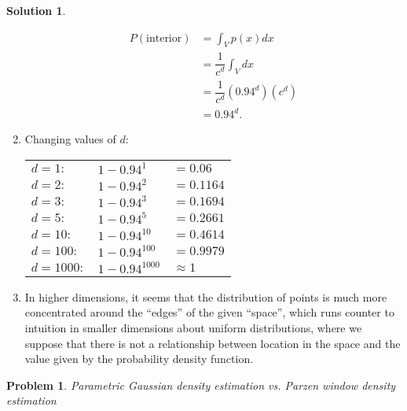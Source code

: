 \documentclass{article}
\newtheorem{problem}{Problem}
\theoremstyle{definition}
\newtheorem*{solution}{Solution}
\begin{document}
\begin{solution}
\begin{enumerate}[1.]
        \begin{equation*}
        	\begin{split}
            	P(\text{interior}) & = \int_{V} p(x) dx \\
                & = \dfrac{1}{c^{d}} \int_{V} dx \\
                & = \dfrac{1}{c^{d}} (0.94^{d})(c^{d}) \\& = 0.94^{d}.
            \end{split}
        \end{equation*}
        
        \item Changing values of $d$: \\
        	\begin{center}
        	\begin{tabular}{l l l}
            	$d = 1:$ & $1 - 0.94^{1}$ & $= 0.06$ \\
                $d = 2:$ & $1 - 0.94^{2}$ & $= 0.1164$ \\
                $d = 3:$ & $1 - 0.94^{3}$ & $= 0.1694$ \\
                $d = 5:$ & $1 - 0.94^{5}$ & $= 0.2661$ \\
                $d = 10:$ & $1 - 0.94^{10}$ & $= 0.4614$ \\
                $d = 100:$ & $1 - 0.94^{100}$ & $= 0.9979$ \\
                $d = 1000:$ & $1 - 0.94^{1000}$ & $\approx 1$ \\
        	\end{tabular}
           	\end{center}
        
        \item In higher dimensions, it seems that the distribution of points is much more concentrated around the ``edges'' of the given ``space'', which runs counter to intuition in smaller dimensions about uniform distributions, where we suppose that there is not a relationship between location in the space and the value given by the probability density function.
        
    \end{enumerate}
\end{solution}

\begin{problem}
Parametric Gaussian density estimation vs. Parzen window density estimation
\end{problem}
\end{document}
